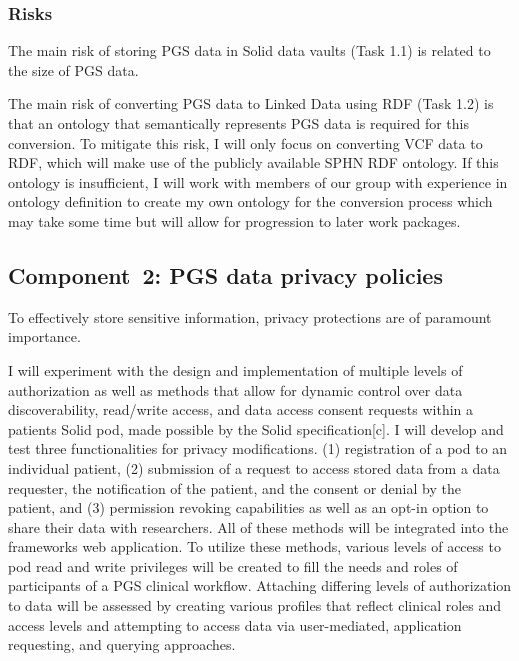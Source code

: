 \documentclass[a4paper,11pt]{article}
\begin{document}
\begin{refsection}
\subsubsection{Risks}
The main risk of storing PGS data in Solid data vaults (Task 1.1)
is related to the size of PGS data. 

The main risk of converting PGS data to Linked Data using RDF (Task 1.2)
is that an ontology that semantically represents PGS data is required for this conversion. 
To mitigate this risk, I will only focus on converting VCF data to RDF, which will make use of the publicly available SPHN RDF ontology.
If this ontology is insufficient, I will work with members of our group with experience in ontology definition to create my own ontology for the conversion process which may take some time but will allow for progression to later work packages.


\newcommand\WPb{PGS data privacy policies}
\subsection{Component~2: \WPb}

To effectively store sensitive information, privacy protections are of paramount importance. 

I will experiment with the design and implementation of multiple levels of authorization as well as methods that allow for dynamic control over data discoverability, read/write access, and data access consent requests within a patient\textquotesingle s Solid pod, made possible by the Solid specification[c]. 
I will develop and test three functionalities for privacy modifications.
(1) registration of a pod to an individual patient,
(2) submission of a request to access stored data from a data requester, the notification of the patient, and the consent or denial by the patient, and
(3) permission revoking capabilities as well as an opt-in option to share their data with researchers. 
All of these methods will be integrated into the framework\textquotesingle s web application.
To utilize these methods, various levels of access to pod read and write privileges will be created to fill the needs and roles of participants of a PGS clinical workflow. 
Attaching differing levels of authorization to data will be assessed by creating various profiles that reflect clinical roles and access levels and attempting to access data via user-mediated, application requesting, and querying approaches. 


\end{refsection}
\end{document}

